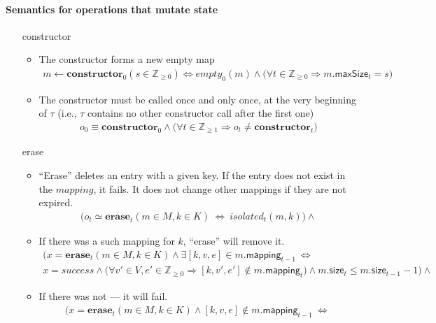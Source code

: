 \documentclass{article}
\renewcommand{\o}[1]{\ensuremath{\mathbf{#1}}}
\newcommand{\p}[1]{\ensuremath{\mathit{#1}}}
\newcommand{\s}[1]{\ensuremath{\mathsf{#1}}}
\newcommand{\nintset}{\ensuremath{\mathds{Z}_{\ge 0}}}
\newcommand{\moreset}[1]{\ensuremath{\mathds{Z}_{\ge #1}}}
\begin{document}
\paragraph{Semantics for operations that mutate state}
\begin{itemize}
\item[constructor]
  \begin{itemize}
  \item The constructor forms a new empty map
    \begin{gather*}
      m \gets \o{constructor}_0(s \in \nintset) \Leftrightarrow \p{empty}_0(m) \wedge \big(\forall t \in \nintset \Rightarrow m.\s{maxSize}_t=s\big)
    \end{gather*}
  \item The constructor must be called once and only once, at the very beginning of $\tau$ (i.e., $\tau$ contains no other constructor call after the first one)
    \begin{gather*}
      o_0 \equiv \o{constructor}_0 \wedge \big(\forall t\in \moreset{1} \Rightarrow o_t \neq \o{constructor}_t\big)
    \end{gather*}
  \end{itemize}
\item[erase]
  \begin{itemize}
  \item ``Erase'' deletes an entry with a given key. If the entry does not exist in the \p{mapping}, it fails. It does not change other mappings if they are not expired.
    \begin{gather*}
      \Big(o_t \simeq \o{erase}_t(m\in M, k\in K) ~\Leftrightarrow~ \p{isolated}_t(m, k)\Big) \wedge
    \end{gather*}
  \item If there was a such mapping for $k$, ``erase'' will remove it.
    \begin{gather}
      \Big(x=\o{erase}_t(m\in M, k\in K) \wedge \exists [k, v, e] \in m.\s{mapping}_{t-1} ~\Leftrightarrow~\nonumber\\
      x=success \wedge \big(\forall v'\in V, e'\in \nintset \Rightarrow [k, v', e'] \not\in m.\s{mapping}_t\big) \wedge m.\s{size}_t \le m.\s{size}_{t-1}-1 \Big) \wedge
      \label{eq:erase1}
    \end{gather}
  \item If there was not --- it will fail.
    \begin{gather}
      \Big( x=\o{erase}_t(m\in M, k\in K) \wedge [k,v,e]\not\in m.\s{mapping}_{t-1} ~\Leftrightarrow~ \nonumber\\

\end{gather}
\end{itemize}
\end{itemize}
\end{document}
